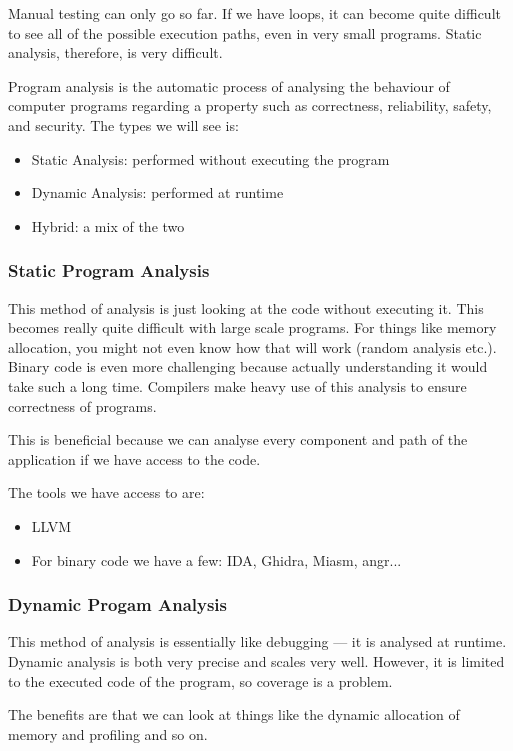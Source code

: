 \documentclass[11pt,a4paper,titlepage,dvipsnames,cmyk]{scrartcl}
\begin{document}
Manual testing can only go so far. If we have loops, it can become quite difficult to see all of the possible execution paths, even in very small programs. Static analysis, therefore, is very difficult.

Program analysis is the automatic process of analysing the behaviour of computer programs regarding a property such as correctness, reliability, safety, and security. The types we will see is:
\begin{itemize}
    \item Static Analysis: performed without executing the program
    \item Dynamic Analysis: performed at runtime
    \item Hybrid: a mix of the two
\end{itemize}

\subsubsection{Static Program Analysis}
This method of analysis is just looking at the code without executing it. This becomes really quite difficult with large scale programs. For things like memory allocation, you might not even know how that will work (random analysis etc.). Binary code is even more challenging because actually understanding it would take such a long time. Compilers make heavy use of this analysis to ensure correctness of programs.

This is beneficial because we can analyse every component and path of the application if we have access to the code.


The tools we have access to are:
\begin{itemize}
    \item LLVM
    \item For binary code we have a few: IDA, Ghidra, Miasm, angr...
\end{itemize}

\subsubsection{Dynamic Progam Analysis}
This method of analysis is essentially like debugging --- it is analysed at runtime. Dynamic analysis is both very precise and scales very well. However, it is limited to the executed code of the program, so coverage is a problem.

The benefits are that we can look at things like the dynamic allocation of memory and profiling and so on.
\end{document}
